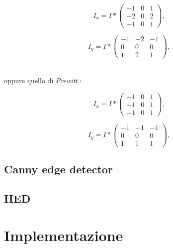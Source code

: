 \vspace*{15pt}
\noindent\begin{minipage}{.5\linewidth}
	\begin{equation}
		I_{x} = I * 
			\begin{pmatrix}
				-1 & 0 & 1 \\
				-2 & 0 & 2\\
				-1 & 0 & 1
			\end{pmatrix},
		\label{eq:sobel-x}
	\end{equation}
\end{minipage}%
\begin{minipage}{.5\linewidth}
	\begin{equation}
		I_{y} = I * 
			\begin{pmatrix}
				-1 & -2 & -1 \\
				0 & 0 & 0\\
				1 & 2 & 1
			\end{pmatrix},
		\label{eq:sobel-y}
	\end{equation}
\end{minipage}\\
oppure quello di \textit{Prewitt} \cite{bib:prewitt}:\\
\noindent\begin{minipage}{.5\linewidth}
	\begin{equation}
		I_{x} = I * 
			\begin{pmatrix}
				-1 & 0 & 1 \\
				-1 & 0 & 1\\
				-1 & 0 & 1
			\end{pmatrix},
		\label{eq:prewitt-x}
	\end{equation}
\end{minipage}%
\begin{minipage}{.5\linewidth}
	\begin{equation}
		I_{y} = I * 
			\begin{pmatrix}
				-1 & -1 & -1 \\
				0 & 0 & 0\\
				1 & 1 & 1
			\end{pmatrix},
		\label{eq:prewitt-y}
	\end{equation}
\end{minipage}


\subsection{Canny edge detector}



\subsection{HED}


\section{Implementazione}
